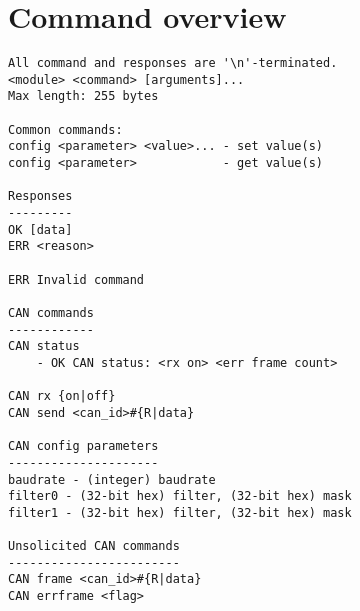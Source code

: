 \documentclass{article}[a4paper]
\begin{document}
\section{Command overview}
\begin{verbatim}
All command and responses are '\n'-terminated.
<module> <command> [arguments]...
Max length: 255 bytes

Common commands:
config <parameter> <value>... - set value(s)
config <parameter>            - get value(s)

Responses
---------
OK [data]
ERR <reason>

ERR Invalid command

CAN commands
------------
CAN status
    - OK CAN status: <rx on> <err frame count>

CAN rx {on|off}
CAN send <can_id>#{R|data}

CAN config parameters
---------------------
baudrate - (integer) baudrate
filter0 - (32-bit hex) filter, (32-bit hex) mask
filter1 - (32-bit hex) filter, (32-bit hex) mask

Unsolicited CAN commands
------------------------
CAN frame <can_id>#{R|data}
CAN errframe <flag>
\end{verbatim}

\begin{comment}
ADC commands
------------
ADC<n> off
ADC<n> single
ADC<n> periodic <period (us)> [offset (us)]
ADC<n> status
    - OK ADC<n> status: <off/single/periodic <period> <offset>>

ADC<n> config raw
ADC<n> config raw              - OK ADC<n> raw: [on/off]
ADC<n> config range <low> <high>
ADC<n> config range            - OK ADC<n> range: <low> <high>
ADC<n> config timestamp <off/on>

Unsolicited ADC commands
------------------------
ADC<n> value [timestamp] <value>

DAC commands
------------
DAC<n> voltage
DAC<n> raw
DAC<n> config range <low> <high>
DAC<n> config range <low> <high>
pwm?

UART commands
-------------
UART<n> send <length>
UART<n>
UART<n> config baudrate <baudrate>
UART<n> config baudrate
UART<n> config format <format>     - e.g. 8n1
UART<n> config format

UART config parameters
----------------------
baudrate - <baudrate int32>
format - <format string> <bits><n|o|p><1|2>
    e.g. 8n1 for 8 bits, no parity and 1 stop bit

Unsolicited UART commands
-------------------------
UART<n> overrun error <n>
UART<n> underrun error <n>
UART<n> framing error <n>
UART<n> parity error <n>
\end{comment}
\end{document}
